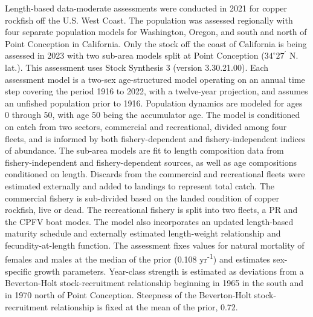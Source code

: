 \documentclass[11pt,
  english,
  letterpaper,
]{article}
\begin{document}
Length-based data-moderate assessments were conducted in 2021 for copper rockfish off the U.S. West Coast. The population was assessed regionally with four separate population models for Washington, Oregon, and south and north of Point Conception in California. Only the stock off the coast of California is being assessed in 2023 with two sub-area models split at Point Conception ($34^\circ 27^\prime$ N. lat.). This assessment uses Stock Synthesis 3 (version 3.30.21.00). Each assessment model is a two-sex age-structured model operating on an annual time step covering the period 1916 to 2022, with a twelve-year projection, and assumes an unfished population prior to 1916. Population dynamics are modeled for ages 0 through 50, with age 50 being the accumulator age. The model is conditioned on catch from two sectors, commercial and recreational, divided among four fleets, and is informed by both fishery-dependent and fishery-independent indices of abundance. The sub-area models are fit to length composition data from fishery-independent and fishery-dependent sources, as well as age compositions conditioned on length. Discards from the commercial and recreational fleets were estimated externally and added to landings to represent total catch. The commercial fishery is sub-divided based on the landed condition of copper rockfish, live or dead. The recreational fishery is split into two fleets, a PR and the CPFV boat modes. The model also incorporates an updated length-based maturity schedule and externally estimated length-weight relationship and fecundity-at-length function. The assessment fixes values for natural mortality of females and males at the median of the prior (0.108 yr\textsuperscript{-1}) and estimates sex-specific growth parameters. Year-class strength is estimated as deviations from a Beverton-Holt stock-recruitment relationship beginning in 1965 in the south and in 1970 north of Point Conception. Steepness of the Beverton-Holt stock-recruitment relationship is fixed at the mean of the prior, 0.72.
\end{document}
